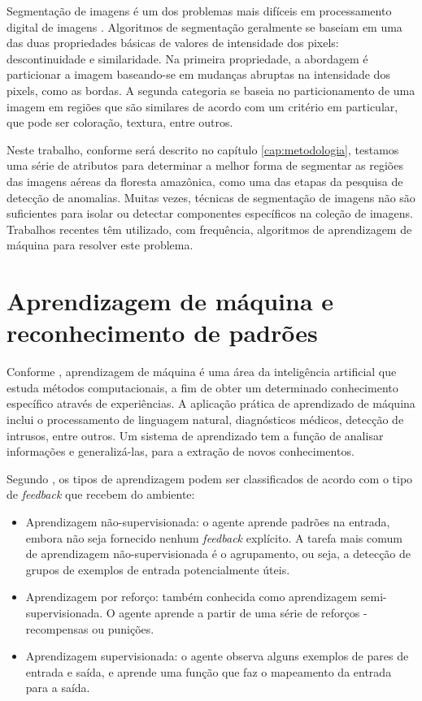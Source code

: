Segmentação de imagens é um dos problemas mais difíceis em processamento digital de imagens \cite{gonzalez:2002}. Algoritmos de segmentação geralmente se baseiam em uma das duas propriedades básicas de valores de intensidade dos pixels: descontinuidade e similaridade. Na primeira propriedade, a abordagem é particionar a imagem baseando-se em mudanças abruptas na intensidade dos pixels, como as bordas. A segunda categoria se baseia no particionamento de uma imagem em regiões que são similares de acordo com um critério em particular, que pode ser coloração, textura, entre outros.

Neste trabalho, conforme será descrito no capítulo \ref{cap:metodologia}, testamos uma série de atributos para determinar a melhor forma de segmentar as regiões das imagens aéreas da floresta amazônica, como uma das etapas da pesquisa de detecção de anomalias. Muitas vezes, técnicas de segmentação de imagens não são suficientes para isolar ou detectar componentes específicos na coleção de imagens. Trabalhos recentes têm utilizado, com frequência, algoritmos de aprendizagem de máquina para resolver este problema.


\section{Aprendizagem de máquina e reconhecimento de padrões}

Conforme , aprendizagem de máquina é uma área da inteligência artificial que estuda métodos computacionais, a fim de obter um determinado conhecimento específico através de experiências. A aplicação prática de aprendizado de máquina inclui o processamento de linguagem natural, diagnósticos médicos, detecção de intrusos, entre outros. Um sistema de aprendizado tem a função de analisar informações e generalizá-las, para a extração de novos conhecimentos.

Segundo , os tipos de aprendizagem podem ser classificados de acordo com o tipo de \textit{feedback} que recebem do ambiente:

\begin{itemize}
    \item Aprendizagem não-supervisionada: o agente aprende padrões na entrada, embora não seja fornecido nenhum \textit{feedback} explícito. A tarefa mais comum de aprendizagem não-supervisionada é o agrupamento, ou seja, a detecção de grupos de exemplos de entrada potencialmente úteis.
    \item Aprendizagem por reforço: também conhecida como aprendizagem semi-supervisionada. O agente aprende a partir de uma série de reforços - recompensas ou punições.
    \item Aprendizagem supervisionada: o agente observa alguns exemplos de pares de entrada e saída, e aprende uma função que faz o mapeamento da entrada para a saída.
\end{itemize}

